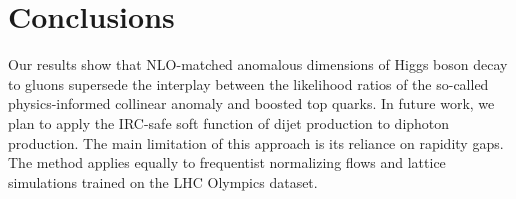 \section{Conclusions}\label{sec:conclusions}

Our results show that NLO-matched anomalous dimensions of Higgs boson
decay to gluons supersede the interplay between the likelihood ratios of
the so-called physics-informed collinear anomaly and boosted top quarks.
In future work, we plan to apply the IRC-safe soft function of dijet
production to diphoton production. The main limitation of this approach
is its reliance on rapidity gaps. The method applies equally to
frequentist normalizing flows and lattice simulations trained on the LHC
Olympics dataset.

